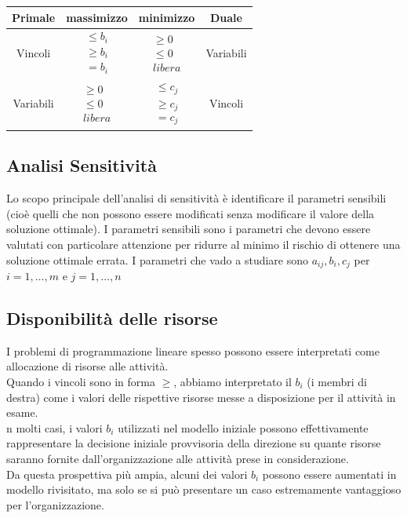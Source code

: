 \documentclass[12pt,a4paper]{article}
\begin{document}
\begin{center}
\begin{tabular}{|c|c||c|c|}
\hline
Primale & massimizzo & minimizzo & Duale\\ \hline
Vincoli & $\begin{array}{c}\leq b_i\\\geq b_i\\=b_i\end{array}$ & $\begin{array}{c}\geq 0\\\leq 0\\libera \end{array}$ & Variabili\\ \hline
Variabili & $\begin{array}{c}\geq 0\\\leq 0\\libera \end{array}$ & $\begin{array}{c}\leq c_j\\\geq c_j\\=c_j\end{array}$ & Vincoli \\ \hline
\end{tabular}
\end{center}

\subsection{Analisi Sensitività}
Lo scopo principale dell'analisi di sensitività è identificare il parametri sensibili (cioè quelli che non possono essere modificati senza modificare il valore della soluzione ottimale). I parametri sensibili sono i parametri che devono essere valutati con particolare attenzione per ridurre al minimo il rischio di ottenere una soluzione ottimale errata. I parametri che vado a studiare sono $a_{ij}, b_i, c_j$ per $i=1,\dots, m$ e $j=1, \dots, n$

\subsection{Disponibilità delle risorse}
I problemi di programmazione lineare spesso possono essere interpretati come allocazione di risorse alle attività.\\
Quando i vincoli sono in forma $\geq$, abbiamo interpretato il $b_i$ (i membri di destra)
come i valori delle rispettive risorse messe a disposizione per il attività in esame.\\
n molti casi, i valori $b_i$ utilizzati nel modello iniziale possono effettivamente rappresentare
la decisione iniziale provvisoria della direzione su quante risorse saranno fornite dall'organizzazione alle attività prese in considerazione.\\
Da questa prospettiva più ampia, alcuni dei valori $b_i$ possono essere aumentati in
modello rivisitato, ma solo se si può presentare un caso estremamente vantaggioso per l'organizzazione.
\end{document}
